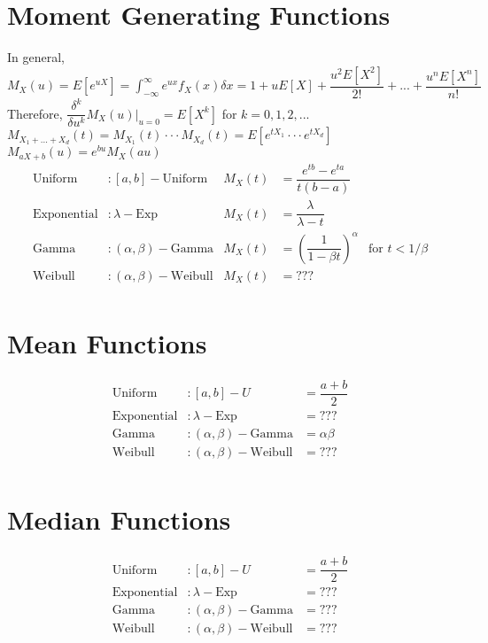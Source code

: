 \documentclass[10pt]{report}
\begin{document}
\section*{Moment Generating Functions}
In general, $M_{X}(u) = E\left[e^{uX}\right] = \int_{-\infty}^{\infty}e^{ux}f_{X}(x)\delta x = 1 + uE[X] + \dfrac{u^{2}E\left[X^{2}\right]}{2!} + ... + \dfrac{u^{n}E\left[X^{n}\right]}{n!}$\\
Therefore, $\dfrac{\delta^{k}}{\delta u^{k}}M_{X}(u)\vert_{u=0} = E\left[X^{k}\right]$ for $k = 0, 1, 2, ...$\\
$M_{X_{1} + ... + X_{d}}(t) = M_{X_{1}}(t) \cdot\cdot\cdot M_{X_{d}}(t) = E\left[e^{tX_{1}} \cdot\cdot\cdot e^{tX_{d}}\right]$\\
$M_{aX + b}(u) = e^{bu}M_{X}(au)$\\
\begin{align*}
\text{Uniform}& : [a,b]-\text{Uniform}& M_{X}(t)& = \dfrac{e^{tb}-e^{ta}}{t\left(b-a\right)}\\
\text{Exponential}& : \lambda-\text{Exp}& M_{X}(t)& = \dfrac{\lambda}{\lambda - t}\\
\text{Gamma}& : (\alpha, \beta)-\text{Gamma}& M_{X}(t)& = \left(\dfrac{1}{1 - \beta t}\right)^{\alpha}& \text{for } t < 1/\beta\\ 
\text{Weibull}& : (\alpha, \beta)-\text{Weibull}& M_{X}(t)& = ???\\
\end{align*}

\pagebreak

\section*{Mean Functions}
\begin{align*}
\text{Uniform}& : [a,b]-U& = \dfrac{a+b}{2}\\
\text{Exponential}& : \lambda-\text{Exp}& = ???\\
\text{Gamma}& : (\alpha, \beta)-\text{Gamma}& = \alpha\beta\\ 
\text{Weibull}& : (\alpha, \beta)-\text{Weibull}& = ???\\
\end{align*}

\pagebreak

\section*{Median Functions}
\begin{align*}
\text{Uniform}& : [a,b]-U& = \dfrac{a+b}{2}\\
\text{Exponential}& : \lambda-\text{Exp}& = ???\\
\text{Gamma}& : (\alpha, \beta)-\text{Gamma}& = ???\\ 
\text{Weibull}& : (\alpha, \beta)-\text{Weibull}& = ???\\
\end{align*}
\end{document}
